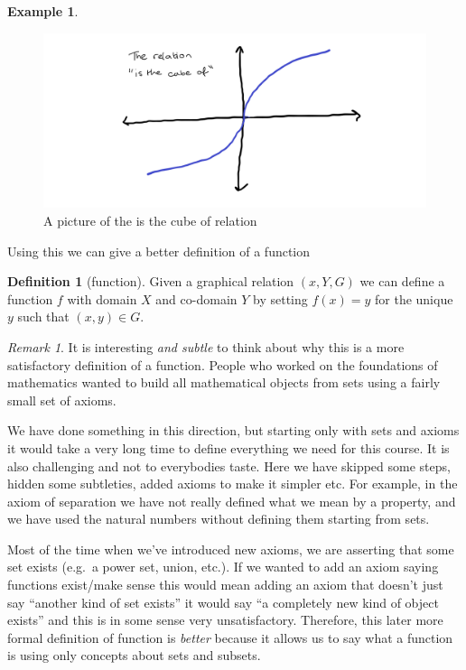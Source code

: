 \documentclass[
]{book}
\theoremstyle{definition}
\newtheorem{definition}{Definition}[chapter]
\theoremstyle{definition}
\newtheorem{example}{Example}[chapter]
\theoremstyle{definition}
\theoremstyle{definition}
\theoremstyle{remark}
\newtheorem*{remark}{Remark}
\begin{document}
\begin{example}
\begin{figure}
\centering
\includegraphics{is the cube of.png}
\caption{\label{fig:unnamed-chunk-8}A picture of the is the cube of relation}
\end{figure}

\end{example}

Using this we can give a better definition of a function

\begin{definition}[function]
Given a graphical relation \((x,Y,G)\) we can define a function \(f\) with domain \(X\) and co-domain \(Y\) by setting \(f(x) = y\) for the unique \(y\) such that \((x,y) \in G\).
\end{definition}

\begin{remark}
It is interesting \emph{and subtle} to think about why this is a more satisfactory definition of a function. People who worked on the foundations of mathematics wanted to build all mathematical objects from sets using a fairly small set of axioms.

We have done something in this direction, but starting only with sets and axioms it would take a very long time to define everything we need for this course. It is also challenging and not to everybodies taste. Here we have skipped some steps, hidden some subtleties, added axioms to make it simpler etc. For example, in the axiom of separation we have not really defined what we mean by a property, and we have used the natural numbers without defining them starting from sets.

Most of the time when we've introduced new axioms, we are asserting that some set exists (e.g.~a power set, union, etc.). If we wanted to add an axiom saying functions exist/make sense this would mean adding an axiom that doesn't just say ``another kind of set exists'' it would say ``a completely new kind of object exists'' and this is in some sense very unsatisfactory. Therefore, this later more formal definition of function is \emph{better} because it allows us to say what a function is using only concepts about sets and subsets.
\end{remark}
\end{document}

